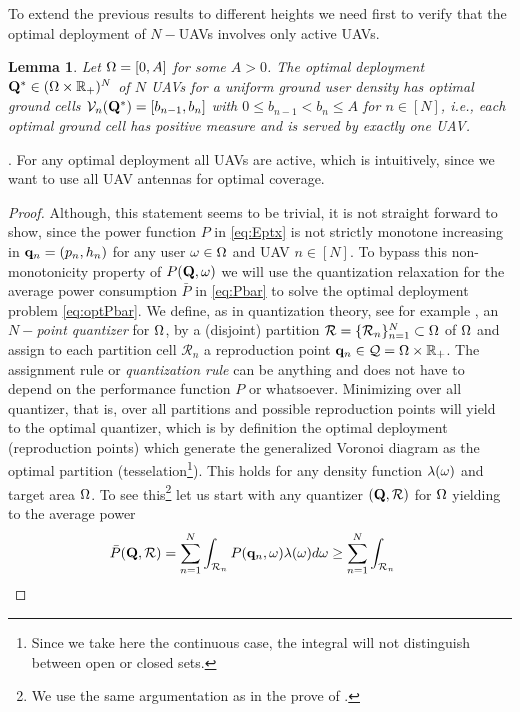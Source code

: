 \documentclass[smallabstract,smallcaptions]{dccpaper}
\newtheorem{lemma}{Lemma}
\newenvironment{remark}{\par\vspace{1.5ex}\noindent{\em Remark\/}.}{\par\vspace{1.5ex}}
\newcounter{example}[section]
\newcommand{\Pbar}{\ensuremath{\bar{P}}}         %
\newcommand{\Vor}{\ensuremath{\mathcal{V}}}         %
\newcommand{\Rset}{\ensuremath{\mathcal R}}
\newcommand{\Qset}{\ensuremath{\mathcal Q}}
\newcommand{\philippstart}{\color{black}}
\begin{document}
To extend the previous results to different heights we need first to verify that the optimal deployment of $N-$UAVs
involves only active UAVs. 
%
\philippstart
%
\begin{lemma}\label{lemma:allActive}
  Let $\Omega=[0,A]$ for some $A>0$. The optimal deployment $\mathbf Q^*\in(\Omega\times{\ensuremath{\mathbb R}}_+)^N$ of $N$ UAVs for a uniform
  ground user density has optimal ground cells $\Vor_n(\vQ^*)=[b_{n-1},b_n]$ with $0\leq b_{n-1}<b_n\leq
  A$ for $n\in[N]$,
  i.e., each optimal ground cell has positive measure and is served by exactly one UAV. 
\end{lemma}
%
\begin{remark}
  For any optimal deployment all UAVs are active, which is intuitively, since we want to use all UAV
  antennas for optimal coverage.
\end{remark}
%
\begin{proof}
  Although, this statement seems to be trivial, it is not straight forward to show, since the power function $P$ in
  \eqref{eq:Eptx} is not strictly monotone increasing in ${\mathbf q}_n=(p_n,h_n)$ for any user $\omega \in\Omega$ and UAV
  $n\in[N]$. To bypass this non-monotonicity property of $P(\mathbf Q,\omega)$ we will use the quantization relaxation for the
  average power consumption $\Pbar$ in \eqref{eq:Pbar} to  solve the optimal deployment problem \eqref{eq:optPbar}. We
  define, as in quantization theory, see for example \cite{GN98}, an \emph{$N-$point quantizer} for $\Omega$, by a
  (disjoint) partition $\Rset=\{\Rset_n\}_{n=1}^N\subset \Ome$ of $\Omega$ and assign to each partition cell $\Rset_n$ a
  reproduction point $\vq_n\in\Qset=\Ome\times\R_+$. The assignment rule or \emph{quantization rule} can be anything and
  does not have to depend on the performance function $P$ or whatsoever.  Minimizing over all quantizer, that is, over
  all partitions and possible reproduction points will yield to the optimal quantizer, which is by definition the
  optimal deployment (reproduction points) which generate the generalized Voronoi diagram as the optimal partition
  (tesselation\footnote{Since we take here the continuous case, the integral will not distinguish between open or closed
  sets.}). This holds for any density function $\lambda(\omega)$ and target area $\Omega$.  To see this\footnote{We use the
    same argumentation as in the prove of \cite[Prop.1]{KJ17}.} let us start with any quantizer $(\vQ,\Rset)$ for $\Omega$
    yielding to the average power 
  \begin{align}
    \Pbar(\vQ,\Rset)=\sum_{n=1}^N \int_{\Rset_n} P(\vq_n,\ome)\lam(\ome) d\ome &\geq \sum_{n=1}^N \int_{\Rset_n} 

\end{align}
\end{proof}
\end{document}

